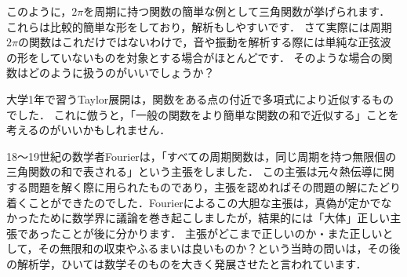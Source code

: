 このように，$2 \pi$を周期に持つ関数の簡単な例として三角関数が挙げられます．
これらは比較的簡単な形をしており，解析もしやすいです．
さて実際には周期$2 \pi$の関数はこれだけではないわけで，音や振動を解析する際には単純な正弦波の形をしていないものを対象とする場合がほとんどです．
そのような場合の関数はどのように扱うのがいいでしょうか？

大学1年で習うTaylor展開は，関数をある点の付近で多項式により近似するものでした．
これに倣うと，「一般の関数をより簡単な関数の和で近似する」ことを考えるのがいいかもしれません．

18〜19世紀の数学者Fourierは，「すべての周期関数は，同じ周期を持つ無限個の三角関数の和で表される」という主張をしました．
この主張は元々熱伝導に関する問題を解く際に用られたものであり，主張を認めればその問題の解にたどり着くことができたのでした．Fourierによるこの大胆な主張は，真偽が定かでなかったために数学界に議論を巻き起こしましたが，結果的には「大体」正しい主張であったことが後に分かります．
主張がどこまで正しいのか・また正しいとして，その無限和の収束やふるまいは良いものか？という当時の問いは，その後の解析学，ひいては数学そのものを大きく発展させたと言われています．

